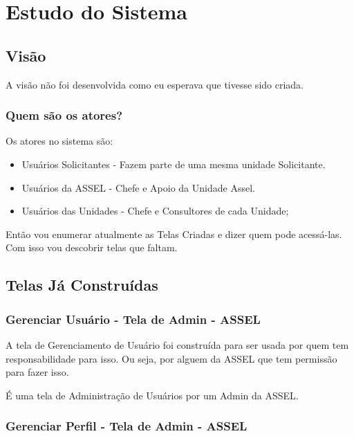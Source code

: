 \chapter{Estudo do Sistema}

\section{Visão}

A visão não foi desenvolvida como eu esperava que tivesse sido criada.


\subsection{Quem são os atores?}

Os atores no sistema são:

\begin{itemize}
	\item Usuários Solicitantes - Fazem parte de uma mesma unidade Solicitante.
	
	\item Usuários da ASSEL - Chefe e Apoio da Unidade Assel.
	
	\item Usuários das Unidades - Chefe e Consultores de cada Unidade;
\end{itemize}


Então vou enumerar atualmente as Telas Criadas e dizer quem pode acessá-las. Com isso vou descobrir telas que faltam.

\section{Telas Já Construídas}

\subsection{Gerenciar Usuário - Tela de Admin - ASSEL}

A tela de Gerenciamento de Usuário foi construída para ser usada por quem tem responsabilidade para isso. Ou seja, por alguem da ASSEL que tem permissão para fazer isso.

É uma tela de Administração de Usuários por um Admin da ASSEL.


\subsection{Gerenciar Perfil  - Tela de Admin - ASSEL}

